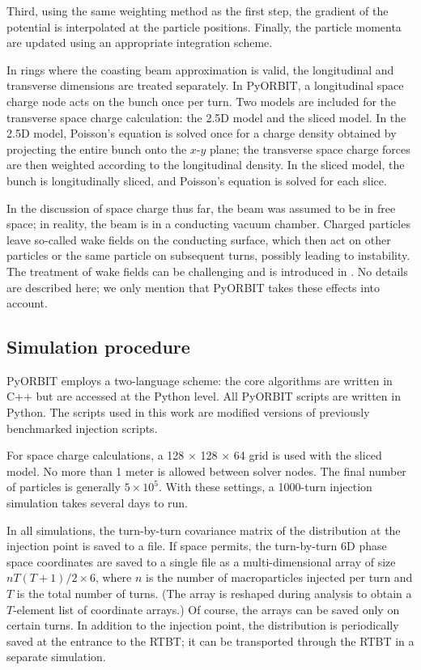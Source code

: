 %
Third, using the same weighting method as the first step, the gradient of the potential is interpolated at the particle positions. Finally, the particle momenta are updated using an appropriate integration scheme.

In rings where the coasting beam approximation is valid, the longitudinal and transverse dimensions are treated separately. In PyORBIT, a longitudinal space charge node acts on the bunch once per turn. Two models are included for the transverse space charge calculation: the 2.5D model and the sliced model. In the 2.5D model, Poisson’s equation is solved once for a charge density obtained by projecting the entire bunch onto the $x$-$y$ plane; the transverse space charge forces are then weighted according to the longitudinal density. In the sliced model, the bunch is longitudinally sliced, and Poisson’s equation is solved for each slice.

In the discussion of space charge thus far, the beam was assumed to be in free space; in reality, the beam is in a conducting vacuum chamber. Charged particles leave so-called wake fields on the conducting surface, which then act on other particles or the same particle on subsequent turns, possibly leading to instability. The treatment of wake fields can be challenging and is introduced in \cite{Chao1993}. No details are described here; we only mention that PyORBIT takes these effects into account.






\subsection{Simulation procedure}

PyORBIT employs a two-language scheme: the core algorithms are written in C++ but are accessed at the Python level. All PyORBIT scripts are written in Python. The scripts used in this work are modified versions of previously benchmarked injection scripts.

For space charge calculations, a 128 $\times$ 128 $\times$ 64 grid is used with the sliced model. No more than 1 meter is allowed between solver nodes. The final number of particles is generally $5 \times 10^{5}$. With these settings, a 1000-turn injection simulation takes several days to run.

In all simulations, the turn-by-turn covariance matrix of the distribution at the injection point is saved to a file. If space permits, the turn-by-turn 6D phase space coordinates are saved to a single file as a multi-dimensional array of size $n T (T + 1) / 2 \times 6$, where $n$ is the number of macroparticles injected per turn and $T$ is the total number of turns. (The array is reshaped during analysis to obtain a $T$-element list of coordinate arrays.) Of course, the arrays can be saved only on certain turns. In addition to the injection point, the distribution is periodically saved at the entrance to the RTBT; it can be transported through the RTBT in a separate simulation.





